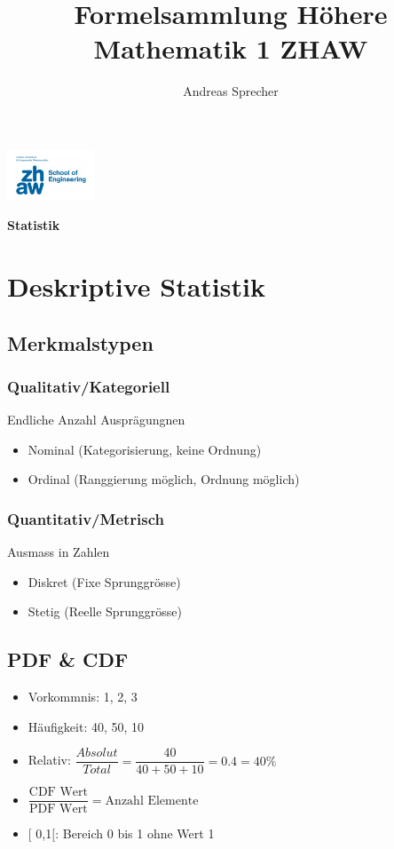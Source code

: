 \documentclass[8pt,a4paper]{scrartcl}
\title{Formelsammlung Höhere Mathematik 1 ZHAW}
\author{Andreas Sprecher}
\renewcommand{\emph}[1]{\textbf{#1}}                                                            %
\begin{document}
\begin{multicols*}{3}
\setlength{\columnseprule}{0.4pt}
    \parbox{3cm}{
        \includegraphics[height=1.5cm]{./img/Logo.jpeg}
    }
    \parbox{4cm}{
        \emph{\Large{Statistik}}
    }
    \vspace{-2mm} 

    \section{Deskriptive Statistik}
    		\subsection{Merkmalstypen}
    			\subsubsection{Qualitativ/Kategoriell}
    				Endliche Anzahl Ausprägungnen
    				\begin{itemize}\itemsep0pt				
					\item Nominal (Kategorisierung, keine Ordnung)
					\item Ordinal (Ranggierung möglich, Ordnung möglich)
				\end{itemize}
    			\subsubsection{Quantitativ/Metrisch}
    				Ausmass in Zahlen
    				\begin{itemize}\itemsep0pt				
					\item Diskret (Fixe Sprunggrösse)
					\item Stetig (Reelle Sprunggrösse)
				\end{itemize}
		\subsection{PDF \& CDF}
			\begin{itemize}\itemsep0pt				
				\item Vorkommnis: 1, 2, 3
				\item Häufigkeit: 40, 50, 10
				\item Relativ: $\dfrac{Absolut}{Total} = \dfrac{40}{40+50+10} = 0.4 = 40 \%$
				\item $\dfrac{\textrm{CDF Wert}}{\textrm{PDF Wert}} = \textrm{Anzahl Elemente}$
				\item $[$ 0,1$[$: Bereich 0 bis 1 ohne Wert 1
			\end{itemize}		


\end{multicols*}
\end{document}

